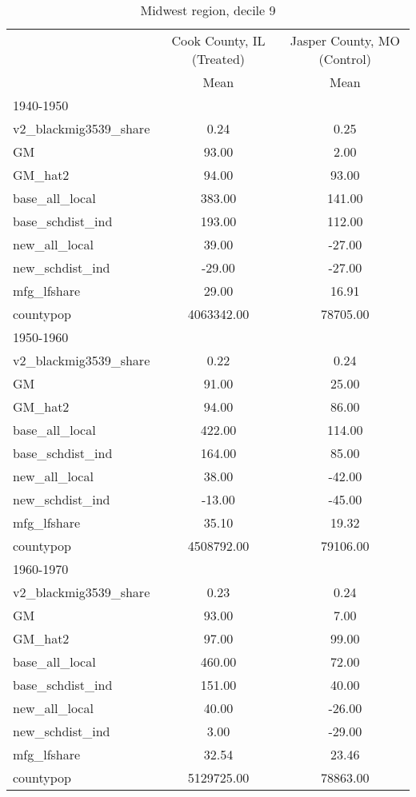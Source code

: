 \begin{table}[htbp]\centering
\def\sym#1{\ifmmode^{#1}\else\(^{#1}\)\fi}
\caption{Midwest region, decile 9 \label{tab1}}
\begin{tabular}{l*{2}{c}}
\toprule
                    &\multicolumn{1}{c}{Cook County, IL (Treated)}&\multicolumn{1}{c}{Jasper County, MO (Control)}\\
                    &        Mean&        Mean\\
\midrule
1940-1950           &            &            \\
v2\_blackmig3539\_share&        0.24&        0.25\\
GM                  &       93.00&        2.00\\
GM\_hat2             &       94.00&       93.00\\
base\_all\_local      &      383.00&      141.00\\
base\_schdist\_ind    &      193.00&      112.00\\
new\_all\_local       &       39.00&      -27.00\\
new\_schdist\_ind     &      -29.00&      -27.00\\
mfg\_lfshare         &       29.00&       16.91\\
countypop           &  4063342.00&    78705.00\\
\midrule
1950-1960           &            &            \\
v2\_blackmig3539\_share&        0.22&        0.24\\
GM                  &       91.00&       25.00\\
GM\_hat2             &       94.00&       86.00\\
base\_all\_local      &      422.00&      114.00\\
base\_schdist\_ind    &      164.00&       85.00\\
new\_all\_local       &       38.00&      -42.00\\
new\_schdist\_ind     &      -13.00&      -45.00\\
mfg\_lfshare         &       35.10&       19.32\\
countypop           &  4508792.00&    79106.00\\
\midrule
1960-1970           &            &            \\
v2\_blackmig3539\_share&        0.23&        0.24\\
GM                  &       93.00&        7.00\\
GM\_hat2             &       97.00&       99.00\\
base\_all\_local      &      460.00&       72.00\\
base\_schdist\_ind    &      151.00&       40.00\\
new\_all\_local       &       40.00&      -26.00\\
new\_schdist\_ind     &        3.00&      -29.00\\
mfg\_lfshare         &       32.54&       23.46\\
countypop           &  5129725.00&    78863.00\\
\bottomrule
\end{tabular}
\end{table}
